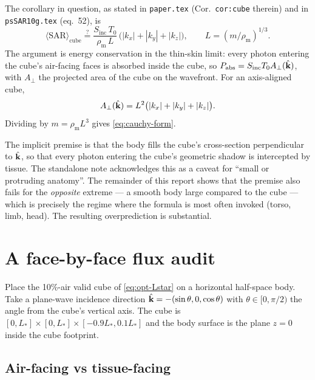 \documentclass[11pt,a4paper]{article}
\theoremstyle{definition}
\theoremstyle{remark}
\newcommand{\Sinc}{S_{\mathrm{inc}}}
\newcommand{\Tzero}{T_0}
\newcommand{\khat}{\hat{\vb{k}}}
\newcommand{\SAR}{\ensuremath{\mathrm{SAR}}}
\newcommand{\rhom}{\rho_{\mathrm{m}}}
\newcommand{\Lact}{L_{\!*}}
\begin{document}
The corollary in question, as stated in \texttt{paper.tex}
(Cor.~\texttt{cor:cube} therein) and in \texttt{psSAR10g.tex} (eq.~52), is
\begin{equation}\label{eq:cauchy-form}
  \langle\SAR\rangle_{\mathrm{cube}}
  \stackrel{?}{=} \frac{\Sinc\,\Tzero}{\rhom\,L}\,
    \bigl(|k_x|+|k_y|+|k_z|\bigr),
  \qquad L = (m/\rhom)^{1/3}.
\end{equation}
The argument is energy conservation in the thin-skin limit: every
photon entering the cube's air-facing faces is absorbed inside the
cube, so $P_{\mathrm{abs}}=\Sinc\Tzero A_\perp(\khat)$, with
$A_\perp$ the projected area of the cube on the wavefront. For an
axis-aligned cube,
\begin{equation}\label{eq:cauchy-area}
  A_\perp(\khat) = L^2\bigl(|k_x|+|k_y|+|k_z|\bigr).
\end{equation}
Dividing by $m=\rhom L^3$ gives \cref{eq:cauchy-form}.

The implicit premise is that the body fills the cube's cross-section
perpendicular to $\khat$, so that every photon entering the cube's
geometric shadow is intercepted by tissue. The standalone note
acknowledges this as a caveat for ``small or protruding anatomy''. The
remainder of this report shows that the premise also fails for the
\emph{opposite} extreme --- a smooth body large compared to the cube
--- which is precisely the regime where the formula is most often
invoked (torso, limb, head). The resulting overprediction is
substantial.


\section{A face-by-face flux audit}
\label{sec:audit}

Place the 10\%-air valid cube of \cref{eq:opt-Lstar} on a horizontal
half-space body. Take a plane-wave incidence direction
$\khat=-(\sin\theta,0,\cos\theta)$ with $\theta\in[0,\pi/2)$ the angle
from the cube's vertical axis. The cube is
$[0,\Lact]\times[0,\Lact]\times[-0.9\Lact, 0.1\Lact]$ and the body
surface is the plane $z=0$ inside the cube footprint.

\subsection{Air-facing vs tissue-facing}
\end{document}
